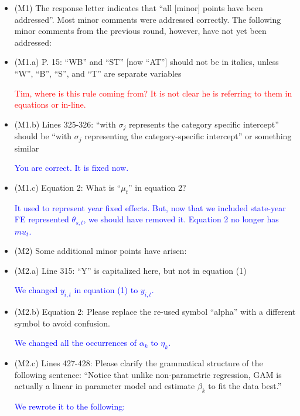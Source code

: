 \documentclass[
]{article}
\begin{document}
\begin{itemize}

\item (M1) The response letter indicates that ``all [minor] points have been addressed''. Most minor comments were addressed correctly. The following minor comments from the previous round, however, have not yet been addressed:

\item (M1.a) P. 15: ``WB'' and ``ST'' [now ``AT''] should not be in italics, unless ``W'', ``B'', ``S'', and ``T'' are separate variables

\textcolor{red}{Tim, where is this rule coming from? It is not clear he is referring to them in equations or in-line.}

\item (M1.b) Lines 325-326: ``with $\sigma_j$ represents the category specific intercept'' should be ``with $\sigma_j$ representing the category-specific intercept'' or something similar

\textcolor{blue}{You are correct. It is fixed now.}

\item (M1.c) Equation 2: What is ``$\mu_t$'' in equation 2?

\textcolor{blue}{It used to represent year fixed effects. But, now that we included state-year FE represented $\theta_{s,t}$, we should have removed it. Equation 2 no longer has $mu_t$.}

\item (M2) Some additional minor points have arisen:

\item (M2.a) Line 315: ``Y'' is capitalized here, but not in equation (1)

\textcolor{blue}{We changed $y_{i,t}$ in equation (1) to $y_{i,t}$.}

\item (M2.b) Equation 2: Please replace the re-used symbol ``alpha'' with a different symbol to avoid confusion.

\textcolor{blue}{We changed all the occurrences of $\alpha_{k}$ to $\eta_{k}$.}

\item (M2.c) Lines 427-428: Please clarify the grammatical structure of the following sentence: ``Notice that unlike non-parametric regression, GAM is actually a linear in parameter model and estimate $\beta_k$ to fit the data best.''

\textcolor{blue}{We rewrote it to the following:}


\end{itemize}
\end{document}
